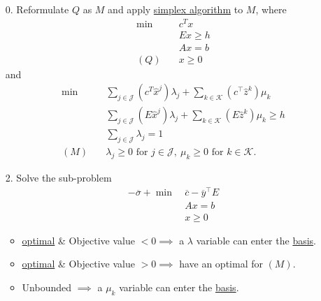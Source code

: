 \begin{enumerate}
	\item[0.] Reformulate \(Q\) as \(M\) and apply \hyperref[algo:simplex-algorithm]{simplex algorithm} to \(M\), where
		\begin{align*}
			\min~    & c^Tx      \\
			         & Ex \geq h \\
			         & Ax = b    \\
			(Q)\quad & x\geq 0
		\end{align*}
		and
		\begin{align*}
			\min~    & \sum\limits_{j\in\mathcal{J}}\left(c^T\hat{x}^j\right)\lambda_{j} + \sum\limits_{k\in\mathcal{K}}\left(c^{\top} \hat{z}^k  \right)\mu_k \\
			         & \sum\limits_{j\in\mathcal{J}}\left(E\hat{x}^j\right)\lambda_{j} + \sum\limits_{k\in\mathcal{K}}\left(E \hat{z}^k \right)\mu_k \geq h    \\
			         & \sum\limits_{j\in\mathcal{J}}\lambda_{j} = 1                                                                                            \\
			(M)\quad & \lambda_{j}\geq 0 \text{ for }j\in\mathcal{J},\ \mu_k\geq 0 \text{ for }k\in\mathcal{K}.
		\end{align*}
	\item[2.] Solve the sub-problem
		\begin{align*}
			-\overline{\sigma}+\min~ & \overline{c} - \overline{y}^{\top}E \\
			                         & Ax = b                              \\
			                         & x\geq 0
		\end{align*}
		\begin{itemize}
			\item \hyperref[def:optimal-solution]{optimal} \& Objective value \(<0 \implies\) a \(\lambda\) variable can enter the \hyperref[def:basic]{basis}.
			\item \hyperref[def:optimal-solution]{optimal} \& Objective value \(>0 \implies\) have an optimal for \((M)\).
			\item Unbounded \(\implies\) a \(\mu_k\) variable can enter the \hyperref[def:basic]{basis}.
		\end{itemize}
\end{enumerate}

